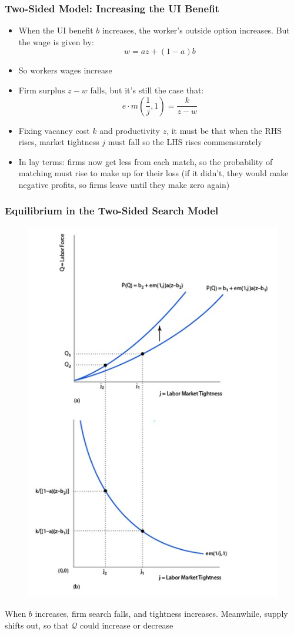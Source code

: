 \documentclass{beamer}
\begin{document}
\begin{frame}
\frametitle[alignment=center]{Two-Sided Model:  Increasing the UI Benefit}
\begin{itemize}
\item When the UI benefit $b$ increases, the worker's outside option increases.  But the wage is given by:
$$w=az+(1-a)b$$
\item So workers wages increase
\bigskip
\item Firm surplus $z-w$ falls, but it's still the case that:
$$e\cdot m\left(\frac{1}{j},1\right)=\frac{k}{z-w}$$
\item Fixing vacancy cost $k$ and productivity $z$, it must be that when the RHS rises, market tightness $j$ must fall so the LHS rises commensurately
\bigskip
\item In lay terms:  firms now get less from each match, so the probability of matching must rise to make up for their loss (if it didn't, they would make negative profits, so firms leave until they make zero again)
\end{itemize}
\end{frame}


\begin{frame}
\frametitle[alignment=center]{Equilibrium in the Two-Sided Search Model}
\begin{figure}
\centering
\includegraphics[scale=0.6]{Figures/W_Fig_6pt21.png}
\end{figure}
When $b$ increases, firm search falls, and tightness increases.  Meanwhile, supply shifts out, so that $\mathcal{Q}$ could increase or decrease 
\end{frame}
\end{document}

